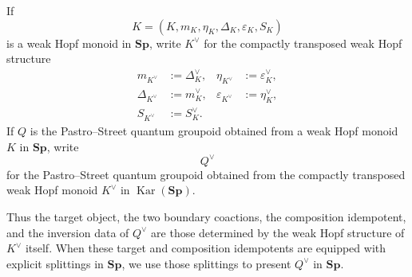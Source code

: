 \documentclass[oneside]{article}
\newcommand{\Sp}{\mathbf{Sp}}
\newcommand{\Kar}{\operatorname{Kar}}
\theoremstyle{plain}
\theoremstyle{definition}
\theoremstyle{remark}
\begin{document}
If
\[
    K=(K,m_K,\eta_K,\Delta_K,\varepsilon_K,S_K)
\]
is a weak Hopf monoid in \(\Sp\), write \(K^\vee\) for the compactly transposed weak Hopf structure
\begin{align*}
    m_{K^\vee}&:=\Delta_K^\vee,
    &
    \eta_{K^\vee}&:=\varepsilon_K^\vee,
    \\
    \Delta_{K^\vee}&:=m_K^\vee,
    &
    \varepsilon_{K^\vee}&:=\eta_K^\vee,
    \\
    S_{K^\vee}&:=S_K^\vee.
\end{align*}
If \(Q\) is the Pastro--Street quantum groupoid obtained from a weak
Hopf monoid \(K\) in \(\Sp\), write
\[
    Q^\vee
\]
for the Pastro--Street quantum groupoid obtained from the compactly
transposed weak Hopf monoid \(K^\vee\) in \(\Kar(\Sp)\).

Thus the target object, the two boundary coactions, the composition
idempotent, and the inversion data of \(Q^\vee\) are those determined by
the weak Hopf structure of \(K^\vee\) itself. When these target and
composition idempotents are equipped with explicit splittings in
\(\Sp\), we use those splittings to present \(Q^\vee\) in \(\Sp\).
\end{document}
